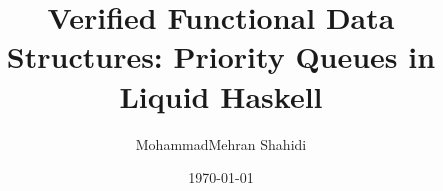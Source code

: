     \title{Verified Functional Data Structures: Priority Queues in Liquid Haskell}

    \author{MohammadMehran Shahidi}

    \date{\today}

    \newcommand{\examinerA}{Prof. Dr. Ralf Hinze}
    \newcommand{\examinerB}{Michael Youssef, M.Sc.}

    \newcommand{\thesisType}{Master}
